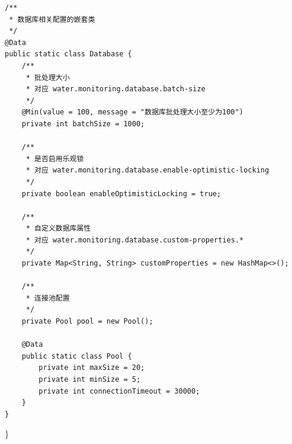 \begin{verbatim}
/**
 * 数据库相关配置的嵌套类
 */
@Data
public static class Database {
    /**
     * 批处理大小
     * 对应 water.monitoring.database.batch-size
     */
    @Min(value = 100, message = "数据库批处理大小至少为100")
    private int batchSize = 1000;
    
    /**
     * 是否启用乐观锁
     * 对应 water.monitoring.database.enable-optimistic-locking
     */
    private boolean enableOptimisticLocking = true;
    
    /**
     * 自定义数据库属性
     * 对应 water.monitoring.database.custom-properties.*
     */
    private Map<String, String> customProperties = new HashMap<>();
    
    /**
     * 连接池配置
     */
    private Pool pool = new Pool();
    
    @Data
    public static class Pool {
        private int maxSize = 20;
        private int minSize = 5;
        private int connectionTimeout = 30000;
    }
}
\end{verbatim}

\}

